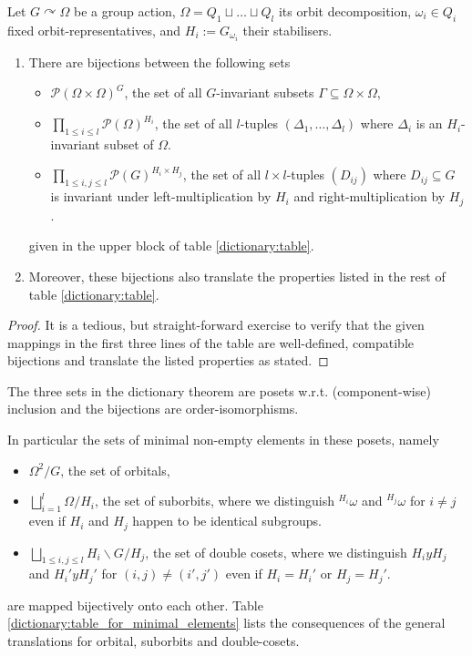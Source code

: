 \documentclass[fontsize=11pt,fleqn,a4paper]{scrartcl}
\begin{document}
\begin{theoremdef}\label{dictionary:theorem}
Let $G \curvearrowright \Omega$ be a group action, $\Omega = Q_1\sqcup\ldots\sqcup Q_l$ its orbit decomposition, $\omega_i\in Q_i$ fixed orbit-representatives, and $H_i:=G_{\omega_i}$ their stabilisers.

\begin{enumerate}
\item There are bijections between the following sets
\begin{itemize}
\item $\mathscr{P}(\Omega\times\Omega)^G$, the set of all $G$-invariant subsets $\Gamma\subseteq\Omega\times\Omega$,
\item $\prod_{1\leq i\leq l} \mathscr{P}(\Omega)^{H_i}$, the set of all $l$-tuples $(\Delta_1,\ldots,\Delta_l)$ where $\Delta_i$ is an $H_i$-invariant subset of $\Omega$.
\item $\prod_{1\leq i,j\leq l} \mathscr{P}(G)^{H_i\times H_j}$, the set of all $l\times l$-tuples $(D_{ij})$ where $D_{ij}\subseteq G$ is invariant under left-multiplication by $H_i$ and right-multiplication by $H_j$.
\end{itemize}
given in the upper block of table \ref{dictionary:table}.

\item Moreover, these bijections also translate the properties listed in the rest of table \ref{dictionary:table}.
\end{enumerate}
\end{theoremdef}
\begin{proof}
It is a tedious, but straight-forward exercise to verify that the given mappings in the first three lines of the table are well-defined, compatible bijections and translate the listed properties as stated.
\end{proof}

\begin{corollary}
The three sets in the dictionary theorem are posets w.r.t. (component-wise) inclusion and the bijections are order-isomorphisms.

In particular the sets of minimal non-empty elements in these posets, namely
\begin{itemize}
\item $\Omega^2/G$, the set of orbitals,
\item $\bigsqcup_{i=1}^l \Omega/H_i$, the set of suborbits, where we distinguish ${^{H_i}\omega}$ and ${^{H_j}\omega}$ for $i\neq j$ even if $H_i$ and $H_j$ happen to be identical subgroups.
\item $\bigsqcup_{1\leq i,j\leq l} H_i\backslash G/H_j$, the set of double cosets, where we distinguish $H_i y H_j$ and $H_i' y H_j'$ for $(i,j)\neq(i',j')$ even if $H_i=H_i'$ or $H_j=H_j'$.
\end{itemize}
are mapped bijectively onto each other. Table \ref{dictionary:table_for_minimal_elements} lists the consequences of the general translations for orbital, suborbits and double-cosets.
\end{corollary}
\end{document}
